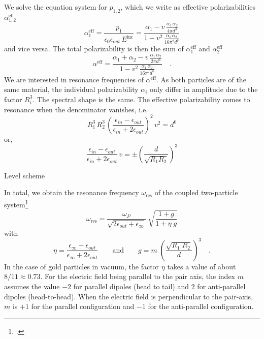 We solve the equation system for $p_{1,2}$, which we write as effective polarizabilities $\alpha^\text{eff}_{1,2}$
\begin{equation}
 \alpha^\text{eff}_1 = \frac{p_1}{\epsilon_0 \epsilon_{out} \, E^\text{inc}} =  \frac{\alpha_1 - v \, \frac{\alpha_1 \, \alpha_2}{4 \pi d^3}}
 {1- v^2 \, \frac{\alpha_1 \, \alpha_2 }{16 \pi^2 d^6}} 
\end{equation}
and vice versa.
The total polarizability  is then the sum of $\alpha^\text{eff}_{1}$ and $\alpha^\text{eff}_{2}$
\begin{equation}
 \alpha^\text{eff} = \frac{\alpha_1  + \alpha_2 - v \, \frac{\alpha_1 \, \alpha_2}{2 \pi d^3}}
 {1- v^2 \, \frac{\alpha_1 \, \alpha_2 }{16 \pi^2 d^6}} \quad .
 \label{eq:5_hybrid_alpha_eff}
\end{equation}
We are interested in resonance frequencies of $\alpha^\text{eff} $. As both particles are of the same material, the individual polarizability $\alpha_i$ only differ in amplitude due to the factor $R_i^3$. The spectral shape is the same. The effective polarizability comes to resonance when the denominator vanishes, i.e.
\begin{equation}
R_1^3 \, R_2^3 \, \left( \frac{\epsilon_{in} - \epsilon_{out}} {\epsilon_{in} + 2 \epsilon_{out}} \right)^2 \, v^2 = d^6
\label{eq:5_hybrid_res_cond}
\end{equation}
or,
\begin{equation}
 \frac{\epsilon_{in} - \epsilon_{out}} {\epsilon_{in} + 2 \epsilon_{out}} \, v = \pm \left( \frac{d}{\sqrt{R_1 R_2}} \right)^3
\end{equation}

\begin{marginfigure}
\caption{Level scheme}
\end{marginfigure}

In total, we obtain the resonance
frequency $\omega_{\text{res}} $ of the coupled two-particle system\footcite{Myroshnychenko08} 
%
\begin{equation}  \label{eq:5_hybrid_omega_coupled}
 \omega_{\text{res}} = \frac{\omega_P}{\sqrt{2 \epsilon_{out} + \epsilon_{\infty}} }  \; \sqrt{
\frac{1 + g}{ 1 +  \eta \; g}}
\end{equation}
%
with 
%
\begin{equation} \label{eq:5_hybrid_omega_coupled_variables}
 \eta = \frac{\epsilon_{\infty} - \epsilon_{out} }{\epsilon_{\infty} + 2 \epsilon_{out}  } 
 \qquad \text{and} \qquad
    g = m \;  \left( \frac{\sqrt{R_1 \; R_2 } } { d }  \right)^3 \quad .
\end{equation}
%
In the case of gold particles in vacuum, the factor $\eta$ takes a value of about $8/11 \approx 0.73$.
For the electric field being parallel to the pair axis, the index $m$ assumes
the value $-2$ for parallel dipoles (head to tail) and $2$ for anti-parallel
dipoles (head-to-head). When the electric field is perpendicular to the
pair-axis, $m$ is $+1$ for the parallel configuration and $-1$ for the
anti-parallel configuration.



